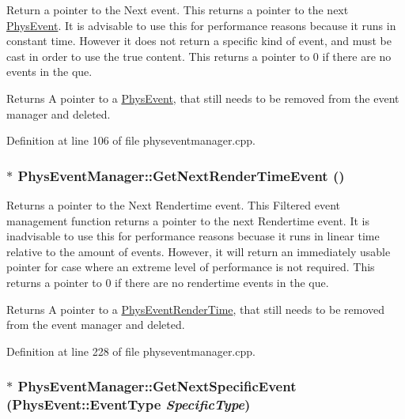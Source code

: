 Return a pointer to the Next event. This returns a pointer to the next \hyperlink{classPhysEvent}{PhysEvent}. It is advisable to use this for performance reasons because it runs in constant time. However it does not return a specific kind of event, and must be cast in order to use the true content. This returns a pointer to 0 if there are no events in the que. \begin{DoxyReturn}{Returns}
A pointer to a \hyperlink{classPhysEvent}{PhysEvent}, that still needs to be removed from the event manager and deleted. 
\end{DoxyReturn}


Definition at line 106 of file physeventmanager.cpp.\hypertarget{classPhysEventManager_a1f2d0506ce816176913e5bdfaa9fd724}{
\subsubsection[{GetNextRenderTimeEvent}]{ $\ast$ PhysEventManager::GetNextRenderTimeEvent ()}}
\label{d5/dd7/classPhysEventManager_a1f2d0506ce816176913e5bdfaa9fd724}


Returns a pointer to the Next Rendertime event. This Filtered event management function returns a pointer to the next Rendertime event. It is inadvisable to use this for performance reasons becuase it runs in linear time relative to the amount of events. However, it will return an immediately usable pointer for case where an extreme level of performance is not required. This returns a pointer to 0 if there are no rendertime events in the que. \begin{DoxyReturn}{Returns}
A pointer to a \hyperlink{classPhysEventRenderTime}{PhysEventRenderTime}, that still needs to be removed from the event manager and deleted. 
\end{DoxyReturn}


Definition at line 228 of file physeventmanager.cpp.\hypertarget{classPhysEventManager_a56e45572c2fb84131f7d55c060c7ac21}{
\subsubsection[{GetNextSpecificEvent}]{ $\ast$ PhysEventManager::GetNextSpecificEvent (PhysEvent::EventType {\em SpecificType})}}
\label{d5/dd7/classPhysEventManager_a56e45572c2fb84131f7d55c060c7ac21}


